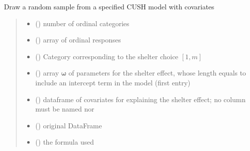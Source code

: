 \documentclass[letterpaper,10pt,english]{sphinxmanual}
\begin{document}
\begin{fulllineitems}
\label{\detokenize{cubmods:cubmods.cush_x.draw}}
\pysigstartsignatures
{}
\pysigstopsignatures
\sphinxAtStartPar
Draw a random sample from a specified CUSH model with covariates
\begin{quote}\begin{description}
\begin{itemize}
\item {} 
\sphinxAtStartPar
{} () \textendash{} number of ordinal categories

\item {} 
\sphinxAtStartPar
{} () \textendash{} array of ordinal responses

\item {} 
\sphinxAtStartPar
{} () \textendash{} Category corresponding to the shelter choice \([1,m]\)

\item {} 
\sphinxAtStartPar
{} () \textendash{} array \(\pmb \omega\) of parameters for the shelter effect, whose length equals 
 to include an intercept term in the model (first entry)

\item {} 
\sphinxAtStartPar
{} () \textendash{} dataframe of covariates for explaining the shelter effect;
no column must be named  nor 

\item {} 
\sphinxAtStartPar
{} () \textendash{} original DataFrame

\item {} 
\sphinxAtStartPar
{} () \textendash{} the formula used


\end{itemize}
\end{description}
\end{quote}
\end{fulllineitems}
\end{document}
